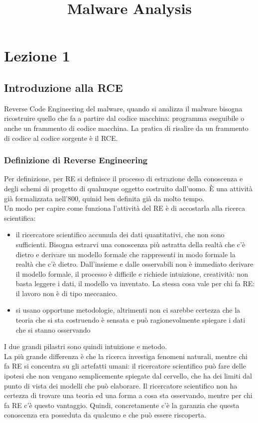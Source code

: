 \documentclass[12pt, oneside]{extbook}
\title{Malware Analysis}
\begin{document}
\maketitle
\tableofcontents
\chapter{Lezione 1}
\section{Introduzione alla RCE}
Reverse Code Engineering del malware, quando si analizza il malware bisogna ricostruire quello che fa a partire dal codice macchina: programma eseguibile o anche un frammento di codice macchina. La pratica di risalire da un frammento di codice al codice sorgente è il RCE.
\subsection{Definizione di Reverse Engineering}
Per definizione, per RE si definisce il processo di estrazione della conoscenza e degli schemi di progetto di qualunque oggetto costruito dall'uomo. È una attività già formalizzata nell'800, quinid ben definita già da molto tempo.\\ Un modo per capire come funziona l'attività del RE è di accostarla alla ricerca scientifica:
\begin{itemize}
\item il ricercatore scientifico accumula dei dati quantitativi, che non sono sufficienti. Bisogna estrarvi una conoscenza più astratta della realtà che c'è dietro e derivare un modello formale che rappresenti in modo formale la realtà che c'è dietro. Dall'insieme e dalle osservabili non è immediato derivare il modello formale, il processo è difficile e richiede intuizione, creatività: non basta leggere i dati, il modello va inventato. La stessa cosa vale per chi fa RE: il lavoro non è di tipo meccanico.
\item si usano opportune metodologie, altrimenti non ci sarebbe certezza che la teoria che si sta costruendo è sensata e può ragionevolmente spiegare i dati che si stanno osservando
\end{itemize}
I due grandi pilastri sono 	quindi intuizione e metodo.\\ La più grande differenza è che la ricerca investiga fenomeni naturali, mentre chi fa RE si concentra su gli artefatti umani: il ricercatore scientifico può fare delle ipotesi che non vengano semplicemente spiegate dal cervello, che ha dei limiti dal punto di vista dei modelli che può elaborare. Il ricercatore scientifico non ha certezza di trovare una teoria ed una forma a cosa sta osservando, mentre per chi fa RE c'è questo vantaggio. Quindi, concretamente c'è la garanzia che questa conoscenza era posseduta da qualcuno e che può essere riscoperta. 
\end{document}
